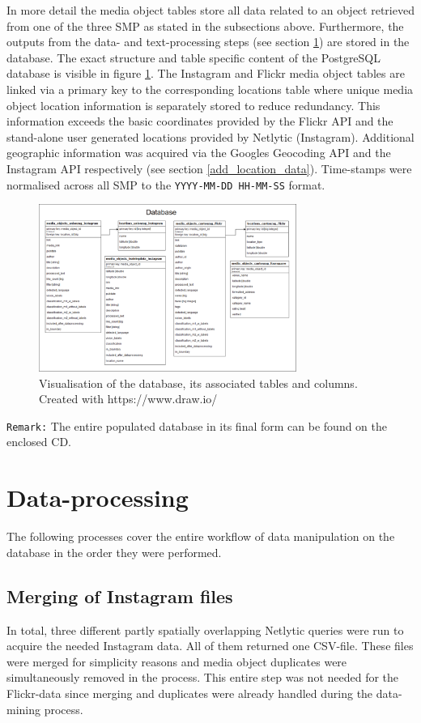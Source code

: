 In more detail the media object tables store all data related to an object retrieved from one of the three SMP as stated in the subsections above. Furthermore, the outputs from the data- and text-processing steps (see section \ref{data_processing}) are stored in the database. The exact structure and table specific content of the PostgreSQL database is visible in figure \ref{fig:database}. The Instagram and Flickr media object tables are linked via a primary key to the corresponding locations table where unique media object location information is separately stored to reduce redundancy. This information exceeds the basic coordinates provided by the Flickr API and the stand-alone user generated locations provided by Netlytic (Instagram). Additional geographic information was acquired via the Googles Geocoding API and the Instagram API respectively (see section \ref{add_location_data}). Time-stamps were normalised across all SMP to the \texttt{YYYY-MM-DD HH-MM-SS} format.

\begin{figure}[h]
   \centering
   \includegraphics[width=0.75\textwidth]{img/fusion_db_overview}
   \caption{Visualisation of the database, its associated tables and columns. \\ Created with https://www.draw.io/}
   \label{fig:database}
\end{figure}

\texttt{Remark:} The entire populated database in its final form can be found on the enclosed CD.

\section{Data-processing} \label{data_processing}
The following processes cover the entire workflow of data manipulation on the database in the order they were performed.
\subsection{Merging of Instagram files} \label{netlytic_files_merge}
In total, three different partly spatially overlapping Netlytic queries were run to acquire the needed Instagram data. All of them returned one CSV-file. These files were merged for simplicity reasons and media object duplicates were simultaneously removed in the process. This entire step was not needed for the Flickr-data since merging and duplicates were already handled during the data-mining process.

